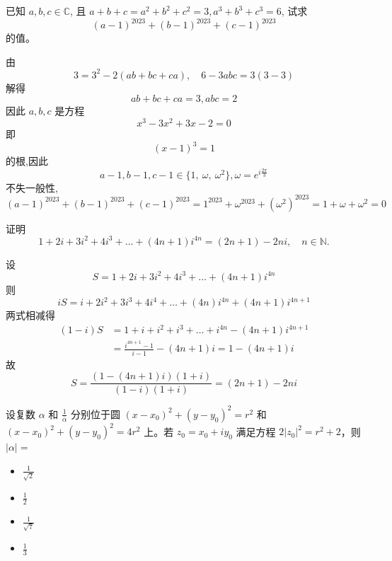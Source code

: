 \begin{questions}
    \question 已知 $a,b,c \in \mathbb{C}$, 且 $a+b+c=a^2+b^2+c^2=3, a^3+b^3+c^3=6$, 试求 
    \[
    (a-1)^{2023}+(b-1)^{2023}+(c-1)^{2023}
    \]
    的值。
    \begin{solution}
        由
        \[
        3=3^{2}-2(ab+bc+ca), \quad 6-3abc=3(3-3)
        \]
        解得
        \[
        ab+bc+ca=3, abc=2
        \]
        因此 $a,b,c$ 是方程
        \[
        x^{3}-3x^{2}+3x-2=0
        \]
        即
        \[
        (x-1)^{3}=1
        \]
        的根,因此
        \[
        a-1,b-1,c-1 \in \{1,\ \omega,\ \omega^{2}\}, \omega=e^{i\frac{2\pi}{3}}
        \]
        不失一般性,
        \[
        (a-1)^{2023}+(b-1)^{2023}+(c-1)^{2023}
        =1^{2023}+\omega^{2023}+(\omega^{2})^{2023}=1+\omega+\omega^{2}=0
        \]
    \end{solution}

    \question 证明
    \[
    1 + 2i + 3i^2 + 4i^3 + \dots + (4n+1)i^{4n}=(2n+1) - 2n i, \quad n \in \mathbb{N}.
    \]
    \begin{solution}
        设
        \[
        S = 1 + 2i + 3i^2 + 4i^3 + \dots + (4n+1)i^{4n}
        \]
        则
        \[
        iS = i + 2i^2 + 3i^3 + 4i^4 + \dots + (4n)i^{4n} + (4n+1)i^{4n+1}
        \]
        两式相减得
        \begin{align*}
        (1-i)S &= 1 + i + i^2 + i^3 + \dots + i^{4n} - (4n+1)i^{4n+1} \\
        &= \frac{i^{4n+1}-1}{i-1} - (4n+1)i = 1 - (4n+1)i
        \end{align*}
        故
        \[
        S = \frac{(1 - (4n+1)i)(1+i)}{(1-i)(1+i)} = (2n+1) - 2n i
        \]
    \end{solution}

    \question 设复数 $\alpha$ 和 $\frac{1}{\overline{\alpha}}$ 分别位于圆 $(x - x_0)^2 + (y - y_0)^2 = r^2$ 和 $(x - x_0)^2 + (y - y_0)^2 = 4r^2$ 上。若 $z_0 = x_0 + iy_0$ 满足方程 $2|z_0|^2 = r^2 + 2$，则 $|\alpha| =$

\begin{itemize}
    \item[(A)] $\frac{1}{\sqrt{2}}$
    \item[(B)] $\frac{1}{2}$
    \item[(C)] $\frac{1}{\sqrt{7}}$
    \item[(D)] $\frac{1}{3}$
\end{itemize}


\end{questions}
